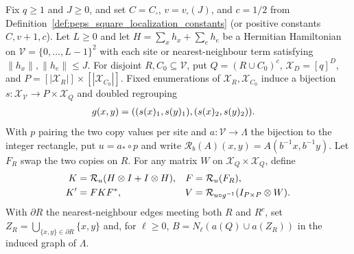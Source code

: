 \begin{lemma}
    \label{thm:peps_supported_physical_buffer_gaussian}
    \leanok
    Fix $q\ge1$ and $J\ge0$, and set $C=C_\square$, $v=v_\square(J)$, and
    $c=1/2$ from Definition~\ref{def:peps_square_localization_constants}
    (or positive constants $C,v+1,c$). Let $L\ge0$ and let
    $H=\sum_x h_x+\sum_e h_e$ be a Hermitian Hamiltonian on
    $\mathcal V=\{0,\ldots,L-1\}^2$ with each site or nearest-neighbour term
    satisfying $\|h_x\|,\|h_e\|\le J$. For disjoint $R,C_0\subseteq\mathcal V$,
    put $Q=(R\cup C_0)^c$, $\mathcal X_D=[q]^D$, and
    $P=[|\mathcal X_R|]\times[|\mathcal X_{C_0}|]$. Fixed enumerations of
    $\mathcal X_R,\mathcal X_{C_0}$ induce a bijection
    $s:\mathcal X_{\mathcal V}\to P\times\mathcal X_Q$ and doubled regrouping
    \begin{align}
        g(x,y) & =((s(x)_1,s(y)_1),(s(x)_2,s(y)_2)). \notag
    \end{align}
    With $p$ pairing the two copy values per site and $a:\mathcal V\to\Lambda$
    the bijection to the integer rectangle, put $u=a_*\circ p$ and write
    $\mathcal R_b(A)(x,y)=A(b^{-1}x,b^{-1}y)$. Let $F_R$ swap the two copies
    on $R$. For any matrix $W$ on $\mathcal X_Q\times\mathcal X_Q$, define
    \begin{align}
        K  & =\mathcal R_u(H\otimes I+I\otimes H),                &
        F  & =\mathcal R_u(F_R), \notag                             \\
        K' & =FKF^*,                                              &
        V  & =\mathcal R_{u\circ g^{-1}}(I_{P\times P}\otimes W).
        \label{eq:peps_supported_buffer_operators}
    \end{align}
    With $\partial R$ the nearest-neighbour edges meeting both $R$ and $R^c$,
    set $Z_R=\bigcup_{\{x,y\}\in\partial R}\{x,y\}$ and, for $\ell\ge0$,
    $B=N_\ell(a(Q)\cup a(Z_R))$ in the induced graph of $\Lambda$.


\end{lemma}
